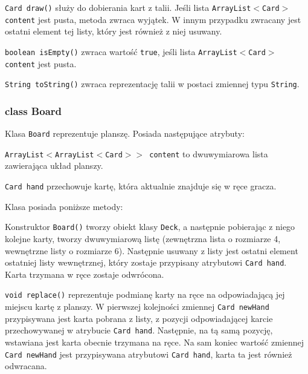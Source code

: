 \documentclass{article}
\begin{document}
\texttt{Card draw()} służy do dobierania kart z talii. Jeśli lista \texttt{ArrayList$<$Card$>$ content} jest pusta, metoda zwraca wyjątek. W innym przypadku zwracany jest ostatni element tej listy, który jest również z niej usuwany.

\texttt{boolean isEmpty()} zwraca wartość \texttt{true}, jeśli lista \texttt{ArrayList$<$Card$>$ content} jest pusta.

\texttt{String toString()} zwraca reprezentację talii w postaci zmiennej typu \texttt{String}.

\subsubsection*{class Board}

\begin{center}
\end{center}

Klasa \texttt{Board} reprezentuje planszę. Posiada następujące atrybuty:

\texttt{ArrayList$<$ArrayList$<$Card$>>$ content} to dwuwymiarowa lista zawierająca układ planszy.

\texttt{Card hand} przechowuje kartę, która aktualnie znajduje się w ręce gracza.

Klasa posiada poniższe metody:

Konstruktor \texttt{Board()} tworzy obiekt klasy \texttt{Deck}, a następnie pobierając z niego kolejne karty, tworzy dwuwymiarową listę (zewnętrzna lista o rozmiarze 4, wewnętrzne listy o rozmiarze 6). Następnie usuwany z listy jest ostatni element ostatniej listy wewnętrznej, który zostaje przypisany atrybutowi \texttt{Card hand}. Karta trzymana w ręce zostaje odwrócona.

\texttt{void replace()} reprezentuje podmianę karty na ręce na odpowiadającą jej miejscu kartę z planszy. W pierwszej kolejności zmiennej \texttt{Card newHand} przypisywana jest karta pobrana z listy, z pozycji odpowiadającej karcie przechowywanej w atrybucie \texttt{Card hand}. Następnie, na tą samą pozycję, wstawiana jest karta obecnie trzymana na ręce. Na sam koniec wartość zmiennej \texttt{Card newHand} jest przypisywana atrybutowi \texttt{Card hand}, karta ta jest również odwracana.
\end{document}
